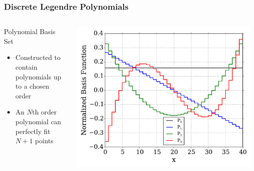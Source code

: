 \documentclass[fleqn]{beamer}
\begin{document}
  \begin{frame}
      \frametitle{Discrete Legendre Polynomials}
      \begin{columns}[T]
          \begin{column}{0.4\textwidth}
              \begin{block}{Polynomial Basis Set}
                  \begin{itemize}
                      \item Constructed to contain polynomials up to a chosen 
                      order
                      \item An $N$th order polynomial can perfectly fit $N+1$ 
                      points
                  \end{itemize}
              \end{block}
          \end{column}
          \begin{column}{0.6\textwidth}
              \includegraphics[trim=.1cm .25cm .1cm .4cm, clip=true,
              totalheight=0.65\textheight]{Figures/DLP_basis}
          \end{column}
      \end{columns}
  \end{frame}
\end{document}
